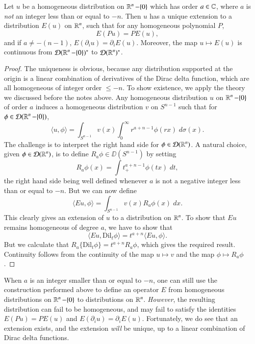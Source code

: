 \begin{theorem}
    Let $u$ be a homogeneous distribution on $\operatorname{\mathbb{R}}^n - \{ 0 \}$ which has order $a \in \operatorname{\mathbb{C}}$, where $a$ is \emph{not} an integer less than or equal to $-n$. Then $u$ has a unique extension to a distribution $E(u)$ on $\operatorname{\mathbb{R}}^n$, such that for any homogeneous polynomial $P$,
    \[ E(Pu) = P E(u), \]
    and if $a \neq -(n-1)$, $E(\partial_i u) = \partial_i E(u)$. Moreover, the map $u \mapsto E(u)$ is continuous from $\operatorname{\mathcal{D}}(\operatorname{\mathbb{R}}^n - \{ 0 \})^*$ to $\operatorname{\mathcal{D}}(\operatorname{\mathbb{R}}^n)^*$.
\end{theorem}
\begin{proof}
    The uniqueness is obvious, because any distribution supported at the origin is a linear combination of derivatives of the Dirac delta function, which are all homogeneous of integer order $\leq -n$. To show existence, we apply the theory we discussed before the notes above. Any homogeneous distribution $u$ on $\operatorname{\mathbb{R}}^n - \{ 0 \}$ of order $a$ induces a homogeneous distribution $v$ on $S^{n-1}$ such that for $\phi \in \operatorname{\mathcal{D}}(\operatorname{\mathbb{R}}^n - \{ 0 \})$,
    \[ \langle u, \phi \rangle = \int_{S^{n-1}} v(x) \int_0^\infty r^{a + n - 1} \phi(rx)\; d\sigma(x). \]
    The challenge is to interpret the right hand side for $\phi \in \operatorname{\mathcal{D}}(\operatorname{\mathbb{R}}^n)$. A natural choice, given $\phi \in \operatorname{\mathcal{D}}(\operatorname{\mathbb{R}}^n)$, is to define $R_a \phi \in \DD(S^{n-1})$ by setting
    \[ R_a \phi(x) = \int t^{a + n - 1}_+ \phi(tx)\; dt, \]
    the right hand side being well defined whenever $a$ is not a negative integer less than or equal to $-n$. But we can now define
    \[ \langle Eu, \phi \rangle = \int_{S^{n-1}} v(x) R_a \phi(x)\; dx. \]
    This clearly gives an extension of $u$ to a distribution on $\operatorname{\mathbb{R}}^n$. To show that $Eu$ remains homogeneous of degree $a$, we have to show that
    \[ \langle Eu, \text{Dil}_t \phi \rangle = t^{a + n} \langle Eu, \phi \rangle. \]
    But we calculate that $R_a \{ \text{Dil}_t \phi \} = t^{a + n} R_a \phi$, which gives the required result. Continuity follows from the continuity of the map $u \mapsto v$ and the map $\phi \mapsto R_a \phi$.
\end{proof}

When $a$ is an integer smaller than or equal to $-n$, one can still use the construction performed above to define an operator $E$ from homogeneous distributions on $\operatorname{\mathbb{R}}^n - \{ 0 \}$ to distributions on $\operatorname{\mathbb{R}}^n$. \emph{However}, the resulting distribution can fail to be homogeneous, and may fail to satisfy the identities $E(Pu) = PE(u)$ and $E(\partial_i u) = \partial_i E(u)$. Fortunately, we do see that an extension exists, and the extension \emph{will} be unique, up to a linear combination of Dirac delta functions.

